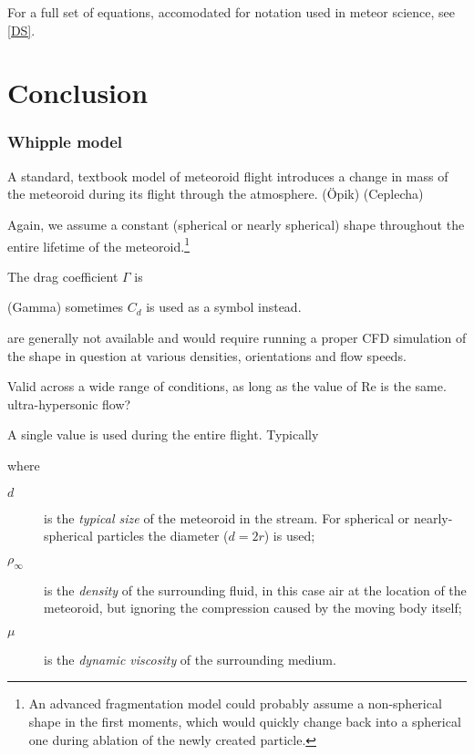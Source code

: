             For a full set of equations, accomodated for notation used in meteor science, see \cref{DS}.

\section{Conclusion} \label{dc}

    \subsubsection{Whipple model} \label{mmw}
        A standard, textbook model of meteoroid flight introduces a change in mass of the meteoroid
        during its flight through the atmosphere. 
        (Öpik) (Ceplecha)

        Again, we assume a constant (spherical or nearly spherical) shape throughout the entire
        lifetime of the meteoroid.\footnote{An advanced fragmentation model could probably assume a non-spherical
        shape in the first moments, which would quickly change back into a spherical one during ablation
        of the newly created particle.}

        The drag coefficient $\Gamma$ is 

        (Gamma) sometimes $C_d$ is used as a symbol instead.

        are generally not available and would require running a proper CFD simulation
        of the shape in question at various densities, orientations and flow speeds.

        Valid across a wide range of conditions, as long as the value of Re is the same.
        ultra-hypersonic flow?

        A single value is used during the entire flight. Typically


        where
        \begin{description}
            \item[$d$] is the \emph{typical size} of the meteoroid in the stream.
                For spherical or nearly-spherical particles the diameter ($d = 2r$) is used;
            \item[$\rho_\infty$] is the \emph{density} of the surrounding fluid, in this case
                air at the location of the meteoroid, but ignoring the compression caused
                by the moving body itself;
            \item[$\mu$] is the \emph{dynamic viscosity} of the surrounding medium.
        \end{description}


